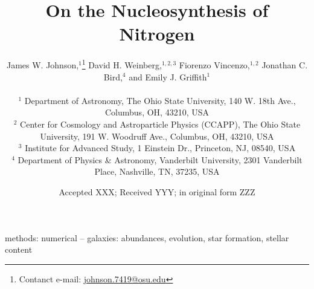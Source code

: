 \documentclass[fleqn, usenatbib]{mnras}
\title[On the Nucleosynthesis of Nitrogen]{On the Nucleosynthesis of Nitrogen}
\author[J.W. Johnson et al.]{James W. Johnson,$^{1}$\thanks{
	Contanct e-mail: \href{mailto:
	johnson.7419@osu.edu}{johnson.7419@osu.edu}} 
	David H. Weinberg,$^{1, 2, 3}$ 
	Fiorenzo Vincenzo,$^{1, 2}$ 
	Jonathan C. Bird,$^{4}$ 
	\newauthor 
	and Emily J. Griffith$^{1}$ 
	\\ \null \\ 
	$^{1}$ Department of Astronomy, The Ohio State University, 
	140 W. 18th Ave., Columbus, OH, 43210, USA 
	\\ 
	$^{2}$ Center for Cosmology and Astroparticle Physics (CCAPP), 
	The Ohio State University, 191 W. Woodruff Ave., Columbus, OH, 43210, USA 
	\\ 
	$^{3}$ Institute for Advanced Study, 1 Einstein Dr., Princeton, NJ, 08540, 
	USA 
	\\ 
	$^{4}$ Department of Physics \& Astronomy, Vanderbilt University, 
	2301 Vanderbilt Place, Nashville, TN, 37235, USA 
}
\date{Accepted XXX; Received YYY; in original form ZZZ}
\begin{document}
 
\label{firstpage} 
\pagerange{\pageref{firstpage}--\pageref{lastpage}} 
\maketitle 

 

\begin{keywords} 
methods: numerical -- galaxies: abundances, evolution, star formation, stellar 
content 
\end{keywords} 

 
 
 
 
 
 

 
 

\label{lastpage} 
\end{document}
